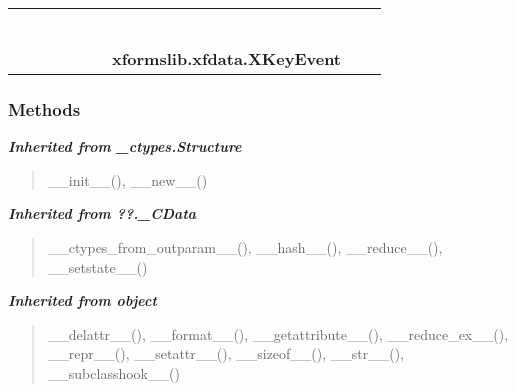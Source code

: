     \label{xformslib:xfdata:XKeyEvent}
\begin{tabular}{cccccccccc}
\multicolumn{2}{r}{\settowidth{\BCL}{object}\multirow{2}{\BCL}{object}}
&&
&&
&&
  \\\cline{3-3}
  &&\multicolumn{1}{c|}{}
&&
&&
&&
  \\
\multicolumn{4}{r}{\settowidth{\BCL}{??.\_CData}\multirow{2}{\BCL}{??.\_CData}}
&&
&&
  \\\cline{5-5}
  &&&&\multicolumn{1}{c|}{}
&&
&&
  \\
\multicolumn{6}{r}{\settowidth{\BCL}{\_ctypes.Structure}\multirow{2}{\BCL}{\_ctypes.Structure}}
&&
  \\\cline{7-7}
  &&&&&&\multicolumn{1}{c|}{}
&&
  \\
&&&&&&\multicolumn{2}{l}{\textbf{xformslib.xfdata.XKeyEvent}}
\end{tabular}



  \subsubsection{Methods}


\large{\textbf{\textit{Inherited from \_ctypes.Structure}}}

\begin{quote}
\_\_init\_\_(), \_\_new\_\_()
\end{quote}

\large{\textbf{\textit{Inherited from ??.\_CData}}}

\begin{quote}
\_\_ctypes\_from\_outparam\_\_(), \_\_hash\_\_(), \_\_reduce\_\_(), \_\_setstate\_\_()
\end{quote}

\large{\textbf{\textit{Inherited from object}}}

\begin{quote}
\_\_delattr\_\_(), \_\_format\_\_(), \_\_getattribute\_\_(), \_\_reduce\_ex\_\_(), \_\_repr\_\_(), \_\_setattr\_\_(), \_\_sizeof\_\_(), \_\_str\_\_(), \_\_subclasshook\_\_()
\end{quote}


